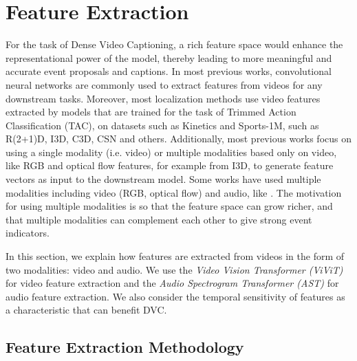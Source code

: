 \chapter{Feature Extraction} \label{chapter:feat}
\par For the task of Dense Video Captioning, a rich feature space would enhance the representational power of the model, thereby leading to more meaningful and accurate event proposals and captions. In most previous works, convolutional neural networks are commonly used to extract features  from videos for any downstream tasks. Moreover, most localization methods use video features extracted by models that are trained for the task of Trimmed Action Classification (TAC), on datasets such as Kinetics\cite{kay2017kinetics} and Sports-1M, such as R(2+1)D\cite{r(2+1)d}, I3D\cite{carreira2018quo}, C3D, CSN \cite{csn} and others. Additionally, most previous works focus on using a single modality (i.e. video) or multiple modalities based only on video, like RGB and optical flow features, for example from I3D\cite{carreira2018quo}, to generate feature vectors as input to the downstream model. Some works have used multiple modalities including video (RGB, optical flow) and audio, like \cite{iashin2020better}. The motivation for using multiple modalities is so that the feature space can grow richer, and that multiple modalities can complement each other to give strong event indicators. 

\par In this section, we explain how features are extracted from videos in the form of two modalities: video and audio. We use the \textit{Video Vision Transformer (ViViT)} \cite{vivit} for video feature extraction and the \textit{Audio Spectrogram Transformer (AST)} \cite{ast} for audio feature extraction. We also consider the temporal sensitivity of features as a characteristic that can benefit DVC.

\section{Feature Extraction Methodology}


